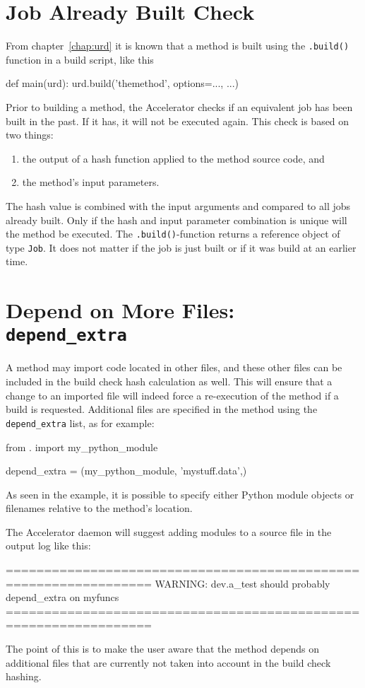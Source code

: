 \section{Job Already Built Check}

From chapter~\ref{chap:urd} it is known that a method is built using
the \texttt{.build()} function in a build script, like this
\begin{python}
def main(urd):
    urd.build('themethod', options=..., ...)
\end{python}

Prior to building a method, the Accelerator checks if an equivalent
job has been built in the past.  If it has, it will not be executed
again.  This check is based on two things:
\begin{enumerate}
\item  the output of a hash function applied to the method source code, and
\item  the method's input parameters.
\end{enumerate}
The hash value is combined with the input arguments and compared to
all jobs already built.  Only if the hash and input parameter
combination is unique will the method be executed.  The
\texttt{.build()}-function returns a reference object of type
\texttt{Job}.  It does not matter if the job is just built or if it
was build at an earlier time.



\section{Depend on More Files:  \texttt{depend\_extra}}

A method may import code located in other files, and these other files
can be included in the build check hash calculation as well.  This
will ensure that a change to an imported file will indeed force a
re-execution of the method if a build is requested.  Additional files
are specified in the method using the \texttt{depend\_extra} list, as
for example:
\begin{python}
from . import my_python_module

depend_extra = (my_python_module, 'mystuff.data',)
\end{python}
As seen in the example, it is possible to specify either Python module
objects or filenames relative to the method's location.

The Accelerator daemon will suggest adding modules to a source file in
the output log like this:
\begin{shell}
=================================================================
WARNING: dev.a_test should probably depend_extra on myfuncs
=================================================================
\end{shell}
The point of this is to make the user aware that the method depends on
additional files that are currently not taken into account in the
build check hashing.



